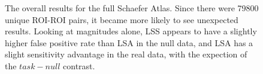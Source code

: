 \documentclass[10pt,letterpaper]{article}
\begin{document}
\begin{figure}[H]
    \centering


    \caption{
        The overall results for the full Schaefer Atlas.
        Since there were 79800 unique ROI-ROI pairs, it became more likely
        to see unexpected results.
        Looking at magnitudes alone, LSS appears to have a slightly
        higher false positive rate than LSA in the null data, and 
        LSA has a slight sensitivity advantage in the real data, 
        with the expection of the $task - null$ contrast.
    }
    \label{fig:significant-contrasts}
\end{figure}

\nolinenumbers

\end{document}
